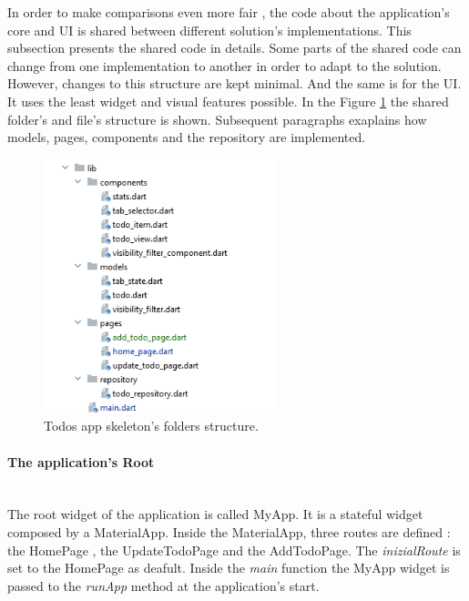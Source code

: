 In order to make comparisons even more fair , the code about the application's core and UI is shared between different solution's implementations. This subsection presents the shared code in details. Some parts of the shared code can change from one implementation to another in order to adapt to the solution. However, changes to this structure are kept minimal. And the same is for the UI. It uses the least widget and visual features possible. In the Figure \ref{fig:todo_app_shared_folder_structure} the shared folder's and file's structure is shown. Subsequent paragraphs exaplains how models, pages, components and the repository are implemented. 

		
		\begin{figure}[H]
		    \centering
		    \includegraphics[width=0.6\textwidth]{Images/folder_structure.png}
		    \caption{Todos app skeleton's folders structure.}
		    \label{fig:todo_app_shared_folder_structure}
		\end{figure}
		
		
		
\paragraph{The application's Root} \mbox{} \\
		\label{par:todo_app_application_root}
The root widget of the application is called MyApp.
It is a stateful widget composed by a MaterialApp. Inside the MaterialApp, three routes are defined : the HomePage , the UpdateTodoPage and the AddTodoPage. The \textit{inizialRoute} is set to the HomePage as deafult. Inside the \textit{main} function the MyApp widget is passed to the \textit{runApp} method at the application's start.
		
